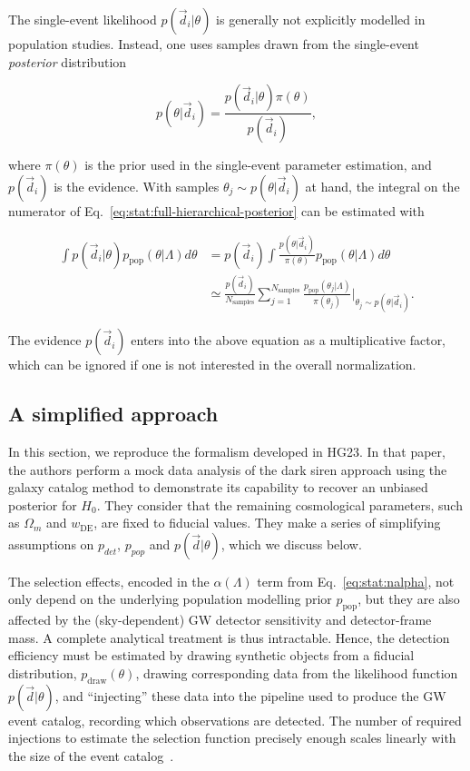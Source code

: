 \documentclass[%
preprint,
nofootinbib,
 amsmath,amssymb,
 aps,
]{revtex4-2}
\newcommand{\given}[2]{p( #1 | #2 )}
\newcommand{\ppop}[0]{p_{\text{pop}}}
\begin{document}
The single-event likelihood $\given{\vec{d}_i}{\theta}$ is generally not explicitly modelled in
population studies. Instead, one uses samples drawn from the single-event \textit{posterior}
distribution

\begin{equation}
	\given{\theta}{\vec{d}_i} = \frac{\given{\vec{d}_i}{\theta} \pi(\theta)}{p(\vec{d}_i)},
\end{equation}

where $\pi(\theta)$ is the prior used in the single-event parameter estimation, and $p(\vec{d}_i)$
is the evidence. With samples $\theta_j \sim \given{\theta}{\vec{d}_i}$ at hand, the integral on
the numerator of Eq.~\eqref{eq:stat:full-hierarchical-posterior} can be estimated with

\begin{align}
	\int \given{\vec{d}_i}{\theta} \ppop(\theta | \Lambda ) d\theta & = p(\vec{d}_i)\int \frac{\given{\theta}{\vec{d}_i}}{\pi(\theta)} \ppop(\theta | \Lambda ) d\theta                                                                             \\
	                                                                & \simeq \frac{p(\vec{d}_i)}{N_\text{samples}} \sum_{j=1}^{N_\text{samples}} \frac{\ppop(\theta_j | \Lambda )}{\pi(\theta_j)} \Big |_{\theta_j \sim \given{\theta}{\vec{d}_i}}.
\end{align}

The evidence $p(\vec{d}_i)$ enters into the above equation as a multiplicative factor, which can be
ignored if one is not interested in the overall normalization.

\subsection{A simplified approach}
\label{sec:stat:simplified}

In this section, we reproduce the formalism developed in HG23. In that paper, the authors perform a
mock data analysis of the dark siren approach using the galaxy catalog method to demonstrate its
capability to recover an unbiased posterior for $H_0$. They consider that the remaining
cosmological parameters, such as $\Omega_m$ and $w_\text{DE}$, are fixed to fiducial values. They
make a series of simplifying assumptions on $p_{det}$, $p_{pop}$ and $\given{\vec{d}}{\theta}$,
which we discuss below.

The selection effects, encoded in the $\alpha (\Lambda )$ term from Eq.~\eqref{eq:stat:nalpha}, not
only depend on the underlying population modelling prior $\ppop$, but they are also affected by the
(sky-dependent) GW detector sensitivity and detector-frame mass. A complete analytical treatment is
thus intractable. Hence, the detection efficiency must be estimated by drawing synthetic objects
from a fiducial distribution, $p_\text{draw}(\theta)$, drawing corresponding data from the
likelihood function $\given{\vec{d}}{\theta}$, and “injecting” these data into the pipeline used to
produce the GW event catalog, recording which observations are detected. The number of required
injections to estimate the selection function precisely enough scales linearly with the size of the
event catalog~\cite{essick2022precision}.
\end{document}
